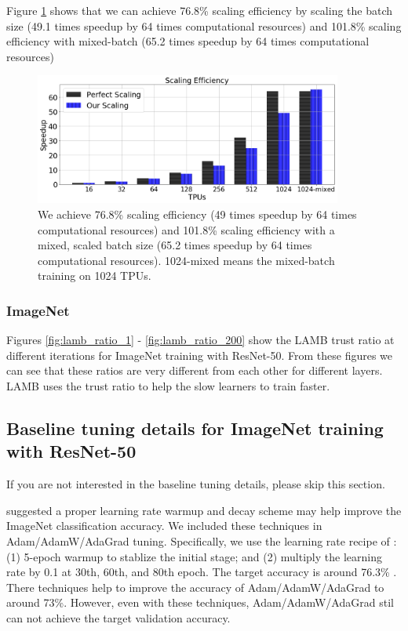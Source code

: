 Figure \ref{fig:bert_scaling} shows that we can achieve 76.8\% scaling efficiency by scaling the batch size (49.1 times speedup by 64 times computational resources) and 101.8\% scaling efficiency with mixed-batch (65.2 times speedup by 64 times computational resources)

\begin{figure}[tb]
\vspace{5pt}
\centering
\includegraphics[width=0.90\textwidth]{figs/bert_scaling.png}
\caption{We achieve 76.8\% scaling efficiency (49 times speedup by 64 times computational resources) and 101.8\% scaling efficiency with a mixed, scaled batch size (65.2 times speedup by 64 times computational resources). 1024-mixed means the mixed-batch training on 1024 TPUs.}
\label{fig:bert_scaling}
\vspace{-10pt}
\end{figure}




\subsubsection{ImageNet}

Figures \ref{fig:lamb_ratio_1} - \ref{fig:lamb_ratio_200} show the LAMB trust ratio at different iterations for ImageNet training with ResNet-50.
From these figures we can see that these ratios are very different from each other for different layers.
LAMB uses the trust ratio to help the slow learners to train faster.

\subsection{Baseline tuning details for ImageNet training with ResNet-50}
If you are not interested in the baseline tuning details, please skip this section.

\citet{goyal2017accurate} suggested a proper learning rate warmup and decay scheme may help improve the ImageNet classification accuracy. 
We included these techniques in Adam/AdamW/AdaGrad tuning.
Specifically, we use the learning rate recipe of \cite{goyal2017accurate}: (1) 5-epoch warmup to stablize the initial stage; and (2) multiply the learning rate by 0.1 at 30th, 60th, and 80th epoch. The target accuracy is around 76.3\% \citep{goyal2017accurate}.
There techniques help to improve the accuracy of Adam/AdamW/AdaGrad to around 73\%.
However, even with these techniques, Adam/AdamW/AdaGrad stil can not achieve the target validation accuracy.

